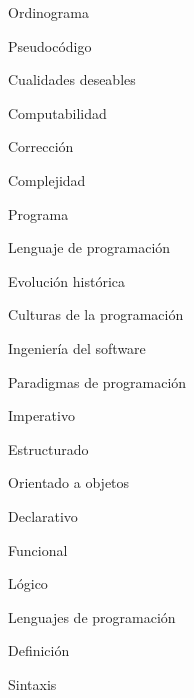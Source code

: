 \begin{longenum}
\begin{longenum}
\begin{longenum}
\begin{longenum}
                \begin{longenum}
                    \item Ordinograma
                    \item Pseudocódigo
                \end{longenum}
                \item Cualidades deseables
                \item Computabilidad
                \item Corrección
                \item Complejidad
            \end{longenum}
            \item Programa
            \item Lenguaje de programación
        \end{longenum}
        \item Evolución histórica
        \begin{longenum}
            \item Culturas de la programación
            \item Ingeniería del software
        \end{longenum}
        \item Paradigmas de programación
        \begin{longenum}
            \item Imperativo
            \begin{longenum}
                \item Estructurado
                \item Orientado a objetos
            \end{longenum}
            \item Declarativo
            \begin{longenum}
                \item Funcional
                \item Lógico
            \end{longenum}
        \end{longenum}
        \item Lenguajes de programación
        \begin{longenum}
            \item Definición
            \begin{longenum}
                \item Sintaxis
                \begin{longenum}

\end{longenum}
\end{longenum}
\end{longenum}
\end{longenum}
\end{longenum}
